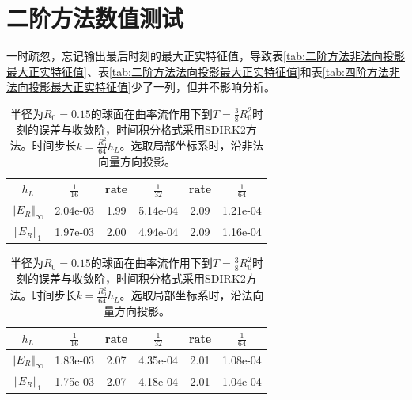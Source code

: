 \documentclass[11pt]{article}
\begin{document}
\section{二阶方法数值测试}
\begin{rem}
  一时疏忽，忘记输出最后时刻的最大正实特征值，导致表\ref{tab:二阶方法非法向投影最大正实特征值}、表\ref{tab:二阶方法法向投影最大正实特征值}和表\ref{tab:四阶方法非法向投影最大正实特征值}少了一列，但并不影响分析。
\end{rem}
\begin{table}[H]
  \centering
  \begin{tabular}{c|ccccc}
    \hline
    $h_L$ & $\frac{1}{16}$ & rate & $\frac{1}{32}$ & rate & $\frac{1}{64} $ \\
    \hline
    $\Vert E_{R}\Vert_{\infty}$ &2.04e-03 & 1.99 & 5.14e-04 & 2.09 & 1.21e-04 \\
    \hline
    $\Vert E_{R}\Vert_{1}$ &  1.97e-03 & 2.00  &  4.94e-04 & 2.09 &  1.16e-04  \\
    \hline
  \end{tabular}
  \caption{半径为$R_0=0.15$的球面在曲率流作用下到$T = \frac{3}{8}R_0^2$时刻的误差与收敛阶，时间积分格式采用SDIRK2方法。时间步长$k=\frac{R_0^2}{64}h_L$。选取局部坐标系时，沿非法向量方向投影。}
  \label{tab:二阶方法非法向投影数值结果}
\end{table}

\begin{table}[H]
  \centering
  \begin{tabular}{c|ccccc}
    \hline
    $h_L$ & $\frac{1}{16}$ & rate & $\frac{1}{32}$ & rate & $\frac{1}{64} $ \\
    \hline
    $\Vert E_{R}\Vert_{\infty}$ &1.83e-03 & 2.07 & 4.35e-04 & 2.01 & 1.08e-04 \\
    \hline
    $\Vert E_{R}\Vert_{1}$ &  1.75e-03 & 2.07  &  4.18e-04 & 2.01 &  1.04e-04  \\
    \hline
  \end{tabular}
  \caption{半径为$R_0=0.15$的球面在曲率流作用下到$T = \frac{3}{8}R_0^2$时刻的误差与收敛阶，时间积分格式采用SDIRK2方法。时间步长$k=\frac{R_0^2}{64}h_L$。选取局部坐标系时，沿法向量方向投影。}
  \label{tab:二阶方法法向投影数值结果}
\end{table}
\end{document}
